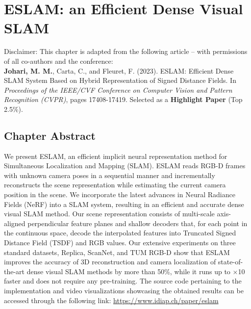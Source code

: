 \chapter{ESLAM: an Efficient Dense Visual SLAM} \label{sec:chapter4}

\begin{tcolorbox}[colback=gray!20, boxrule=1pt, colframe=black]
  Disclaimer: This chapter is adapted from the following article – with permissions of all co-authors and the conference: \\

    \textbf{Johari, M. M.}, Carta, C., and Fleuret, F. (2023). ESLAM: Efficient Dense SLAM System Based on Hybrid Representation of Signed Distance Fields. In \textit{Proceedings of the IEEE/CVF Conference on Computer Vision and Pattern Recognition (CVPR)}, pages 17408-17419. Selected as a \textbf{Highlight Paper} (Top 2.5\%).
\end{tcolorbox}

\section{Chapter Abstract}

We present ESLAM, an efficient implicit neural representation method for Simultaneous Localization and Mapping (SLAM). ESLAM reads RGB-D frames with unknown camera poses in a sequential manner and incrementally reconstructs the scene representation while estimating the current camera position in the scene. We incorporate the latest advances in Neural Radiance Fields (NeRF) into a SLAM system, resulting in an efficient and accurate dense visual SLAM method. Our scene representation consists of multi-scale axis-aligned perpendicular feature planes and shallow decoders that, for each point in the continuous space, decode the interpolated features into Truncated Signed Distance Field (TSDF) and RGB values. Our extensive experiments on three standard datasets, Replica, ScanNet, and TUM RGB-D show that ESLAM improves the accuracy of 3D reconstruction and camera localization of state-of-the-art dense visual SLAM methods by more than 50\%, while it runs up to $\times$10 faster and does not require any pre-training. The source code pertaining to the implementation and video visualizations showcasing the obtained results can be accessed through the following link: \href{https://www.idiap.ch/paper/eslam}{https://www.idiap.ch/paper/eslam}

